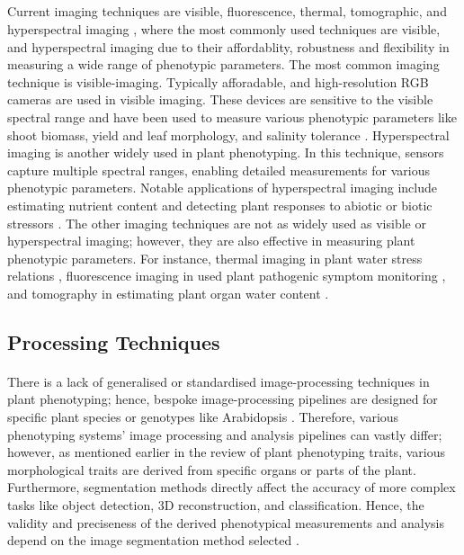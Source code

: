 \subparagraph{}
Current imaging techniques are visible, fluorescence, thermal, tomographic, and hyperspectral imaging \cite{SensorsMeasuringPlant, liReviewImagingTechniques2014}, where the most commonly used techniques are visible, and hyperspectral imaging due to their affordablity, robustness and flexibility in measuring a wide range of phenotypic parameters. The most common imaging technique is visible-imaging. Typically afforadable, and high-resolution RGB cameras are used in visible imaging. These devices are sensitive to the visible spectral range and have been used to measure various phenotypic parameters like shoot biomass, yield and leaf morphology, and salinity tolerance \cite{golzarianAccurateInferenceShoot2011, hoyos-villegasGroundBasedDigitalImaging2014}. Hyperspectral imaging is another widely used in plant phenotyping. In this technique, sensors capture multiple spectral ranges, enabling detailed measurements for various phenotypic parameters. Notable applications of hyperspectral imaging include estimating nutrient content and detecting plant responses to abiotic or biotic stressors \cite{saricApplicationsHyperspectralImaging2022}. The other imaging techniques are not as widely used as visible or hyperspectral imaging; however, they are also effective in measuring plant phenotypic parameters. For instance, thermal imaging in plant water stress relations \cite{liReviewImagingTechniques2014, ishimweApplicationsThermalImaging2014}, fluorescence imaging in used plant pathogenic symptom monitoring \cite{lichtenthalerRoleChlorophyllFluorescence1988, swarbrickMetabolicConsequencesSusceptibility2006}, and tomography in estimating plant organ water content \cite{windtMRILongdistanceWater2006}.

\subsection{Processing Techniques}

\paragraph{}
There is a lack of generalised or standardised image-processing techniques in plant phenotyping; hence, bespoke image-processing pipelines are designed for specific plant species or genotypes like Arabidopsis \cite{liReviewImagingTechniques2014, arvidssonGrowthPhenotypingPipeline2011a}. Therefore, various phenotyping systems' image processing and analysis pipelines can vastly differ; however, as mentioned earlier in the review of plant phenotyping traits, various morphological traits are derived from specific organs or parts of the plant. Furthermore, segmentation methods directly affect the accuracy of more complex tasks like object detection, 3D reconstruction, and classification. Hence, the validity and preciseness of the derived phenotypical measurements and analysis depend on the image segmentation method selected \cite{choudhurySegmentationTechniquesChallenges2020, muller-linowPlantScreenMobile2019}.

